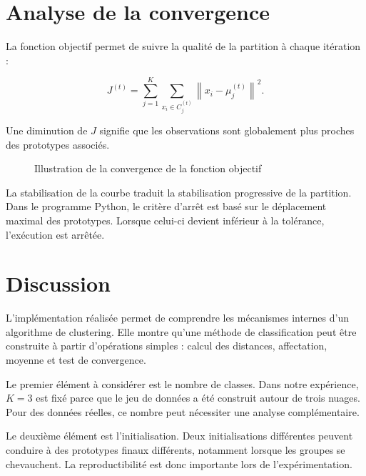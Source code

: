 \documentclass[12pt,a4paper]{article}
\begin{document}
\section{Analyse de la convergence}

La fonction objectif permet de suivre la qualité de la partition à chaque itération :

\[
J^{(t)}=
\sum_{j=1}^{K}
\sum_{x_i\in C_j^{(t)}}
\left\|x_i-\mu_j^{(t)}\right\|^2.
\]

Une diminution de $J$ signifie que les observations sont globalement plus proches des prototypes associés.

\begin{figure}[H]
\centering
{}
\caption{Illustration de la convergence de la fonction objectif}
\end{figure}

La stabilisation de la courbe traduit la stabilisation progressive de la partition. Dans le programme Python, le critère d'arrêt est basé sur le déplacement maximal des prototypes. Lorsque celui-ci devient inférieur à la tolérance, l'exécution est arrêtée.

\section{Discussion}

L'implémentation réalisée permet de comprendre les mécanismes internes d'un algorithme de clustering. Elle montre qu'une méthode de classification peut être construite à partir d'opérations simples : calcul des distances, affectation, moyenne et test de convergence.

Le premier élément à considérer est le nombre de classes. Dans notre expérience, $K=3$ est fixé parce que le jeu de données a été construit autour de trois nuages. Pour des données réelles, ce nombre peut nécessiter une analyse complémentaire.

Le deuxième élément est l'initialisation. Deux initialisations différentes peuvent conduire à des prototypes finaux différents, notamment lorsque les groupes se chevauchent. La reproductibilité est donc importante lors de l'expérimentation.
\end{document}
